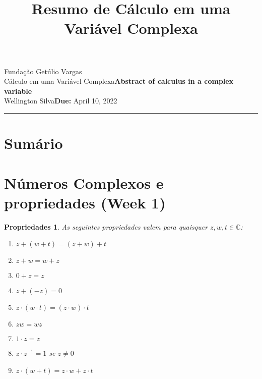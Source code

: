 \documentclass{article}
\title{Resumo de Cálculo em uma Variável Complexa}
\author{}
\date{}
\newtheorem{prop}{Propriedades}
\newcommand{\assignment}{Abstract of calculus in a complex variable}
\newcommand{\duedate}{April 10, 2022}
\begin{document}
Fundação Getúlio Vargas\hfill\\
Cálculo em uma Variável Complexa\hfill\textbf{\assignment}\\
Wellington Silva\hfill\textbf{Due:} \duedate\\
\smallskip\hrule\bigskip

{\let\newpage\relax\maketitle}
\maketitle

\section*{Sumário}

\textbf{}
\vspace{4.0mm}

\textbf{}
\vspace{4.0mm}

\textbf{}
\vspace{4.0mm}

\textbf{}
\vspace{4.0mm}

\textbf{}
\vspace{4.0mm}

\newpage

\section*{Números Complexos e propriedades (Week 1)}
\label{s1}

\begin{prop} As seguintes propriedades valem para quaisquer $z, w, t \in \mathbb{C}$:

\begin{enumerate}[label=(\alph*)]
    \item $z + (w + t) = (z + w) + t$
    \item $z + w = w + z$
    \item $0 + z = z$
    \item $z + (-z) = 0$
    \item $z \cdot (w \cdot t) = (z \cdot w) \cdot t$
    \item $zw = wz$
    \item $1 \cdot z = z$
    \item $z \cdot z^{-1} = 1$ se $z \neq 0$
    \item $z \cdot (w + t) = z \cdot w + z \cdot t$
\end{enumerate}
\end{prop}
\end{document}
